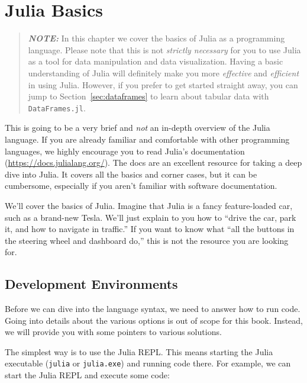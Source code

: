 \documentclass[
  notoc %
]{tufte-book}
\newcommand{\passthrough}[1]{#1}
\begin{document}
\hypertarget{sec:julia_basics}{%
\chapter{Julia Basics}\label{sec:julia_basics}}

\begin{quote}
\textbf{\emph{NOTE:}} In this chapter we cover the basics of Julia as a
programming language. Please note that this is not \emph{strictly
necessary} for you to use Julia as a tool for data manipulation and data
visualization. Having a basic understanding of Julia will definitely
make you more \emph{effective} and \emph{efficient} in using Julia.
However, if you prefer to get started straight away, you can jump to
Section~\ref{sec:dataframes} to learn about tabular data with
\passthrough{\lstinline!DataFrames.jl!}.
\end{quote}

This is going to be a very brief and \emph{not} an in-depth overview of
the Julia language. If you are already familiar and comfortable with
other programming languages, we highly encourage you to read Julia's
documentation (\url{https://docs.julialang.org/}). The docs are an
excellent resource for taking a deep dive into Julia. It covers all the
basics and corner cases, but it can be cumbersome, especially if you
aren't familiar with software documentation.

We'll cover the basics of Julia. Imagine that Julia is a fancy
feature-loaded car, such as a brand-new Tesla. We'll just explain to you
how to ``drive the car, park it, and how to navigate in traffic.'' If
you want to know what ``all the buttons in the steering wheel and
dashboard do,'' this is not the resource you are looking for.

\hypertarget{sec:ide}{%
\section{Development Environments}\label{sec:ide}}

Before we can dive into the language syntax, we need to answer how to
run code. Going into details about the various options is out of scope
for this book. Instead, we will provide you with some pointers to
various solutions.

The simplest way is to use the Julia REPL. This means starting the Julia
executable (\passthrough{\lstinline!julia!} or
\passthrough{\lstinline!julia.exe!}) and running code there. For
example, we can start the Julia REPL and execute some code:
\end{document}
